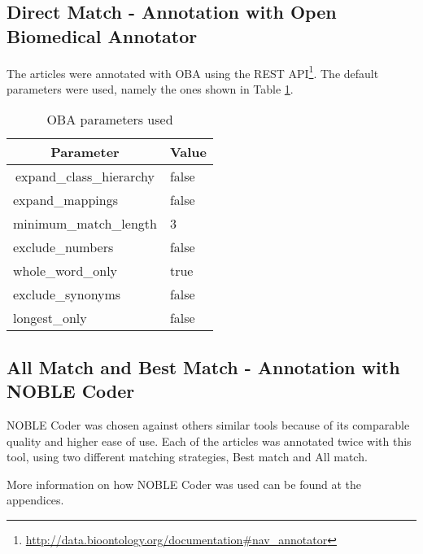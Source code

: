 \subsection{Direct Match - Annotation with Open Biomedical Annotator}

The articles were annotated with OBA using the REST API\footnote{\url{http://data.bioontology.org/documentation\#nav_annotator}}. The default parameters were used, namely the ones shown in Table \ref{table-ncbo-parameters}.

\begin{table}[h]
\centering
\caption{OBA parameters used}
\label{table-ncbo-parameters}
\begin{tabular}{|l|l|}
\hline
\multicolumn{1}{|c|}{\textbf{Parameter}}       & \multicolumn{1}{c|}{\textbf{Value}} \\ \hline
\multicolumn{1}{|c|}{expand\_class\_hierarchy} & false                               \\ \hline
expand\_mappings                               & false                               \\ \hline
minimum\_match\_length                         & 3                                   \\ \hline
exclude\_numbers                               & false                               \\ \hline
whole\_word\_only                              & true                                \\ \hline
exclude\_synonyms                              & false                               \\ \hline
longest\_only                                  & false                               \\ \hline
\end{tabular}
\end{table}

\subsection{All Match and Best Match - Annotation with NOBLE Coder}

NOBLE Coder was chosen against others similar tools because of its comparable quality and higher ease of use. Each of the articles was annotated twice with this tool, using two different matching strategies, Best match and All match.

More information on how NOBLE Coder was used can be found at the appendices.


